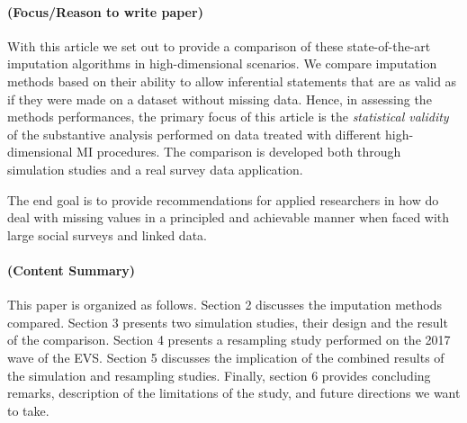 \paragraph{(Focus/Reason to write paper)}
With this article we set out to provide a comparison of these state-of-the-art imputation algorithms in 
high-dimensional scenarios. 
We compare imputation methods based on their ability to allow inferential statements that are as valid as 
if they were made on a dataset without missing data.
Hence, in assessing the methods performances, the primary focus of this article is the \emph{statistical validity}
\citep{rubin:1996} of the substantive analysis performed on data treated with different high-dimensional 
MI procedures.
The comparison is developed both through simulation studies and a real survey data application.

The end goal is to provide recommendations for applied researchers in how do deal with missing values in
a principled and achievable manner when faced with large social surveys and linked data.

\paragraph{(Content Summary)}
This paper is organized as follows. 
Section 2 discusses the imputation methods compared.
Section 3 presents two simulation studies, their design and the result of the comparison.
Section 4 presents a resampling study performed on the 2017 wave of the EVS.
Section 5 discusses the implication of the combined results of the simulation and resampling studies.
Finally, section 6 provides concluding remarks, description of the limitations of the study, and  
future directions we want to take.

